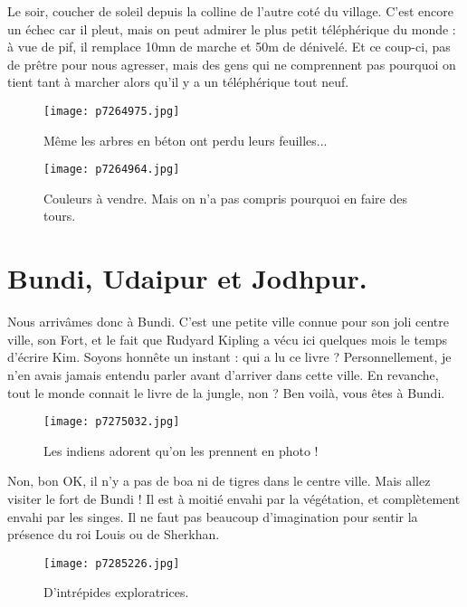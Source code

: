 \documentclass{book}
\begin{document}
Le soir, coucher de soleil depuis la colline de l'autre coté du village. C'est encore un échec car il pleut, mais on peut admirer le plus petit téléphérique du monde : à vue de pif, il remplace 10mn de marche et 50m de dénivelé. Et ce coup-ci, pas de prêtre pour nous agresser, mais des gens qui ne comprennent pas pourquoi on tient tant à marcher alors qu'il y a un téléphérique tout neuf.


\begin{figure}[h]
\centering
\texttt{[image: p7264975.jpg]}
\caption*{Même les arbres en béton ont perdu leurs feuilles...}
\end{figure}


\begin{figure}[h]
\centering
\texttt{[image: p7264964.jpg]}
\caption*{Couleurs à vendre. Mais on n'a pas compris pourquoi en faire des tours.}
\end{figure}



\chapter{Bundi, Udaipur et Jodhpur.}
Nous arrivâmes donc à Bundi. C'est une petite ville connue pour son joli centre ville, son Fort, et le fait que Rudyard Kipling a vécu ici quelques mois le temps d'écrire Kim. Soyons honnête un instant : qui a lu ce livre ? Personnellement, je n'en avais jamais entendu parler avant d'arriver dans cette ville. En revanche, tout le monde connait le livre de la jungle, non ? Ben voilà, vous êtes à Bundi.


\begin{figure}[h]
\centering
\texttt{[image: p7275032.jpg]}
\caption*{Les indiens adorent qu'on les prennent en photo !}
\end{figure}

Non, bon OK, il n'y a pas de boa ni de tigres dans le centre ville. Mais allez visiter le fort de Bundi ! Il est à moitié envahi par la végétation, et complètement envahi par les singes. Il ne faut pas beaucoup d'imagination pour sentir la présence du roi Louis ou de Sherkhan.


\begin{figure}[h]
\centering
\texttt{[image: p7285226.jpg]}
\caption*{D'intrépides exploratrices.}
\end{figure}
\end{document}
